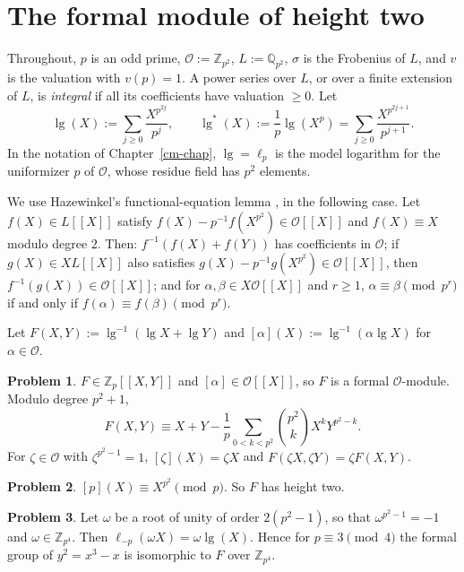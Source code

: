 \documentclass[reqno]{amsart}
\newcounter{chap}
\theoremstyle{definition}
\newtheorem{problem}{Problem}[section]
\theoremstyle{plain}
\newcommand{\Z}{\mathbb{Z}}
\newcommand{\Q}{\mathbb{Q}}
\newcommand{\Oc}{\mathcal{O}}
\newcommand{\lgg}{\operatorname{lg}}
\begin{document}
\section{The formal module of height two}\label{sec:module}

Throughout, \(p\) is an odd prime, \(\Oc := \Z_{p^2}\), \(L := \Q_{p^2}\), \(\sigma\) is the Frobenius of \(L\), and \(v\) is the valuation with \(v(p) = 1\).  A power series over \(L\), or over a finite extension of \(L\), is \emph{integral} if all its coefficients have valuation \(\ge 0\).  Let
\[
  \lgg(X) := \sum_{j \ge 0} \frac{X^{p^{2j}}}{p^j},
  \qquad
  \lgg^*(X) := \frac1p \lgg(X^p) = \sum_{j \ge 0} \frac{X^{p^{2j+1}}}{p^{j+1}} .
\]
In the notation of Chapter~\ref{cm-chap}, \(\lgg = \ell_p\) is the model logarithm for the uniformizer \(p\) of \(\Oc\), whose residue field has \(p^2\) elements.

We use Hazewinkel's functional-equation lemma \cite[\S2.2]{Ha}, \cite[(2.5)--(2.8)]{Ha79} in the following case.  Let \(f(X) \in L[[X]]\) satisfy \(f(X) - p^{-1} f(X^{p^2}) \in \Oc[[X]]\) and \(f(X) \equiv X\) modulo degree \(2\).  Then: \(f^{-1}(f(X) + f(Y))\) has coefficients in \(\Oc\); if \(g(X) \in X L[[X]]\) also satisfies \(g(X) - p^{-1} g(X^{p^2}) \in \Oc[[X]]\), then \(f^{-1}(g(X)) \in \Oc[[X]]\); and for \(\alpha, \beta \in X\Oc[[X]]\) and \(r \ge 1\), \(\alpha \equiv \beta \pmod{p^r}\) if and only if \(f(\alpha) \equiv f(\beta) \pmod{p^r}\).

Let \(F(X,Y) := \lgg^{-1}(\lgg X + \lgg Y)\) and \([\alpha](X) := \lgg^{-1}(\alpha \lgg X)\) for \(\alpha \in \Oc\).

\begin{problem}\label{pr:LT}
\(F \in \Z_p[[X,Y]]\) and \([\alpha] \in \Oc[[X]]\), so \(F\) is a formal \(\Oc\)-module.  Modulo degree \(p^2 + 1\),
\[
  F(X,Y) \equiv X + Y - \frac1p \sum_{0 < k < p^2} \binom{p^2}{k} X^k Y^{p^2-k} .
\]
For \(\zeta \in \Oc\) with \(\zeta^{p^2-1} = 1\), \([\zeta](X) = \zeta X\) and \(F(\zeta X, \zeta Y) = \zeta F(X,Y)\).
\end{problem}

\begin{problem}\label{pr:height}
\([p](X) \equiv X^{p^2} \pmod p\).  So \(F\) has height two.
\end{problem}

\begin{problem}\label{pr:twist}
Let \(\omega\) be a root of unity of order \(2(p^2-1)\), so that \(\omega^{p^2-1} = -1\) and \(\omega \in \Z_{p^4}\).  Then \(\ell_{-p}(\omega X) = \omega \lgg(X)\).  Hence for \(p \equiv 3 \pmod 4\) the formal group of \(y^2 = x^3 - x\) is isomorphic to \(F\) over \(\Z_{p^4}\).
\end{problem}
\end{document}
